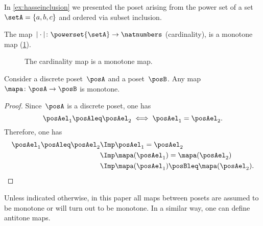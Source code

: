 \begin{example}
  In \cref{ex:hasseinclusion} we presented the poset arising from the power set of a set~$\setA=\{a,b,c\}$ and ordered via subset inclusion.

  The map~$\vert \cdot \vert \colon \powerset{\setA} \to \natnumbers$ (cardinality), is a monotone map (\cref{fig:cardinality}).
  \begin{figure}[h!]
    \begin{center}
    \end{center}
    \caption{The cardinality map is a monotone map. \label{fig:cardinality}}
  \end{figure}
\end{example}

\begin{lemma}
  Consider a discrete poset~$\posA$ and a poset~$\posB$. Any map~$\mapa \colon \posA\to \posB$ is monotone.
\end{lemma}
\begin{proof}
  Since~$\posA$ is a discrete poset, one has
  \begin{equation}
    \posAel_1\posAleq \posAel_2 \iff \posAel_1=\posAel_2.
  \end{equation}
  Therefore, one has
  \begin{equation}
    \begin{aligned}
      \posAel_1\posAleq \posAel_2 &\Imp \posAel_1=\posAel_2\\
      &\Imp \mapa(\posAel_1)=\mapa(\posAel_2)\\
      &\Imp \mapa(\posAel_1)\posBleq \mapa(\posAel_2).
    \end{aligned}
  \end{equation}
\end{proof}
Unless indicated otherwise, in this paper all maps between posets are assumed to be monotone or will turn out to be monotone. In a similar way, one can define antitone maps.


